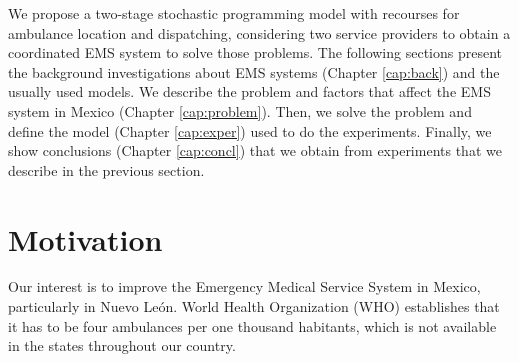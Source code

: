 
We propose a two-stage stochastic programming model with recourses for ambulance location and dispatching, considering two service providers to obtain a coordinated EMS system to solve those problems. The following sections present the background investigations about EMS sys\-tems (Chapter \ref{cap:back}) and the usually used models. We describe the problem and factors that affect the EMS system in Mexico (Chapter \ref{cap:problem}). Then, we solve the problem and define the model (Chapter \ref{cap:exper}) used to do the experiments. Finally, we show conclusions (Chapter \ref{cap:concl}) that we obtain from experiments that we describe in the previous section.

\section{Motivation}
Our interest is to improve the Emergency Medical Service System in Mexico, particularly in Nuevo León. World Health Organization (WHO) establishes that it has to be four ambulances per one thousand habitants, which is not available in the states throughout our country.

